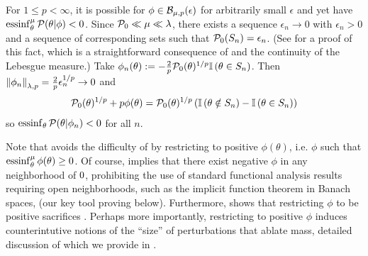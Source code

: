 \begin{ex}
%
For $1 \le p < \infty$, it is possible for $\phi \in
\mathcal{B}_{\mu,p}(\epsilon)$ for arbitrarily small $\epsilon$ and yet have
$\operatorname*{\mathrm{essinf}}^\mu_{\theta} \mathcal{P}(\theta \vert \phi) < 0$.
%
Since $\mathcal{P}_{0} \ll \mu \ll \lambda$, there exists a
sequence $\epsilon_n \rightarrow 0$ with $\epsilon_n > 0$ and a sequence of
corresponding sets such that $\mathcal{P}_{0}(S_n) = \epsilon_n$. (See
 for a proof of this fact, which is a
straightforward consequence of \citet[Proposition 15.5]{nielsen:1997:measure}
and the continuity of the Lebesgue measure.)  Take
%
%
$\phi_n(\theta) := - \frac{2}{p} \mathcal{P}_{0}(\theta)^{1/p} \mathbb{I}\left(\theta \in S_n\right)$.
%
%
Then $\left\Vert\phi_n\right\Vert_{\lambda, p} = \frac{2}{p} \epsilon_n^{1/p} \rightarrow 0$
and
%
\begin{align*}
%
\pbase(\theta)^{1/p} + p \phi(\theta) ={}
\pbase(\theta)^{1/p}
\left(\ind{\theta \notin S_n} - \ind{\theta \in S_n} \right)
%
\end{align*}
%
so $\operatorname*{\mathrm{essinf}}_\theta \mathcal{P}(\theta \vert \phi_n) < 0$ for all $n$.
%
\end{ex}


Note that \citep{gustafson:1996:local} avoids the difficulty of
 by restricting to positive $\phi(\theta)$, i.e. $\phi$ such
that $\operatorname*{\mathrm{essinf}}_\theta^\mu \phi(\theta) \ge 0$.  Of course, 
implies that there exist negative $\phi$ in any neighborhood of $0$,
prohibiting the use of standard functional analysis results requiring open
neighborhoods, such as the implicit function theorem in Banach spaces, (our key
tool proving  below). Furthermore,  shows that restricting $\phi$ to be positive
sacrifices  .  Perhaps more
importantly, restricting to positive $\phi$ induces counterintutive notions of
the ``size'' of perturbations that ablate mass, detailed discussion of which we
provide in .


